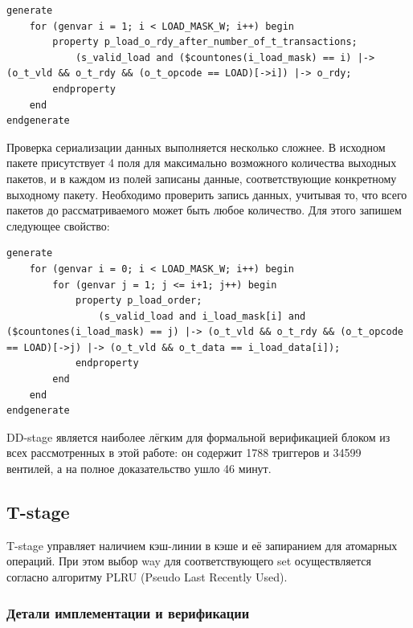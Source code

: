 \begin{minipage}{\textwidth}
\begin{lstlisting}
generate
    for (genvar i = 1; i < LOAD_MASK_W; i++) begin
        property p_load_o_rdy_after_number_of_t_transactions;
            (s_valid_load and ($countones(i_load_mask) == i) |-> (o_t_vld && o_t_rdy && (o_t_opcode == LOAD)[->i]) |-> o_rdy;
        endproperty
    end
endgenerate 
\end{lstlisting}
\end{minipage}

Проверка сериализации данных выполняется несколько сложнее. В исходном пакете присутствует 4 поля для максимально возможного количества выходных пакетов, и в каждом из полей записаны данные, соответствующие конкретному выходному пакету. Необходимо проверить запись данных, учитывая то, что всего пакетов до рассматриваемого может быть любое количество. Для этого запишем следующее свойство: \newline
\begin{minipage}{\textwidth}
\begin{lstlisting}
generate
    for (genvar i = 0; i < LOAD_MASK_W; i++) begin
        for (genvar j = 1; j <= i+1; j++) begin
            property p_load_order;
                (s_valid_load and i_load_mask[i] and ($countones(i_load_mask) == j) |-> (o_t_vld && o_t_rdy && (o_t_opcode == LOAD)[->j) |-> (o_t_vld && o_t_data == i_load_data[i]);
            endproperty
        end
    end
endgenerate 
\end{lstlisting}
\end{minipage}

DD-stage является наиболее лёгким для формальной верификацией блоком из всех рассмотренных в этой работе: он содержит 1788 триггеров и 34599 вентилей, а на полное доказательство ушло 46 минут. 

\subsection{T-stage}

\tab T-stage управляет наличием кэш-линии в кэше и её запиранием для атомарных операций. При этом выбор way для соответствующего set осуществляется согласно алгоритму PLRU (Pseudo Last Recently Used). 

\subsubsection*{Детали имплементации и верификации}


